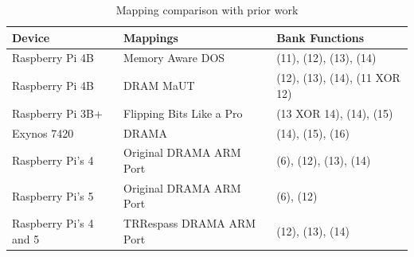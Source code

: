         \begin{table}[ht]
            \centering
            \begin{tabular}{lll}
                \hline
                Device & Mappings & Bank Functions \\
                \hline
                Raspberry Pi 4B & Memory Aware DOS~\cite{paperMemoryAware} & (11), (12), (13), (14) \\
                Raspberry Pi 4B & DRAM MaUT~\cite{paperDRAMMaUT} & (12), (13), (14), (11 XOR 12) \\
                Raspberry Pi 3B+ & Flipping Bits Like a Pro~\cite{paperProFlipping} & (13 XOR 14), (14), (15) \\
                Exynos 7420 & DRAMA~\cite{paperDRAMA} & (14), (15), (16) \\
                Raspberry Pi's 4 & Original DRAMA ARM Port~\cite{paperPraxisarbeit} & (6), (12), (13), (14) \\
                Raspberry Pi's 5 & Original DRAMA ARM Port~\cite{paperPraxisarbeit} & (6), (12) \\
                Raspberry Pi's 4 and 5 & TRRespass DRAMA ARM Port~\cite{paperPraxisarbeit} & (12), (13), (14) \\
                \hline
            \end{tabular}
            \caption{Mapping comparison with prior work}
            \label{tab:mappings}
        \end{table}

